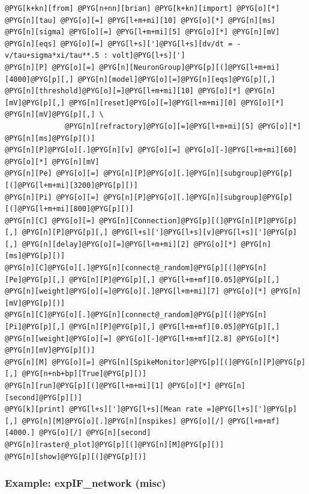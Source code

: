 \documentclass[letterpaper,10pt,english]{manual}
\begin{document}
\begin{Verbatim}[commandchars=@\[\]]
@PYG[k+kn][from] @PYG[n+nn][brian] @PYG[k+kn][import] @PYG[o][*]
@PYG[n][tau] @PYG[o][=] @PYG[l+m+mi][10] @PYG[o][*] @PYG[n][ms]
@PYG[n][sigma] @PYG[o][=] @PYG[l+m+mi][5] @PYG[o][*] @PYG[n][mV]
@PYG[n][eqs] @PYG[o][=] @PYG[l+s][']@PYG[l+s][dv/dt = -v/tau+sigma*xi/tau**.5 : volt]@PYG[l+s][']
@PYG[n][P] @PYG[o][=] @PYG[n][NeuronGroup]@PYG[p][(]@PYG[l+m+mi][4000]@PYG[p][,] @PYG[n][model]@PYG[o][=]@PYG[n][eqs]@PYG[p][,] @PYG[n][threshold]@PYG[o][=]@PYG[l+m+mi][10] @PYG[o][*] @PYG[n][mV]@PYG[p][,] @PYG[n][reset]@PYG[o][=]@PYG[l+m+mi][0] @PYG[o][*] @PYG[n][mV]@PYG[p][,] \
              @PYG[n][refractory]@PYG[o][=]@PYG[l+m+mi][5] @PYG[o][*] @PYG[n][ms]@PYG[p][)]
@PYG[n][P]@PYG[o][.]@PYG[n][v] @PYG[o][=] @PYG[o][-]@PYG[l+m+mi][60] @PYG[o][*] @PYG[n][mV]
@PYG[n][Pe] @PYG[o][=] @PYG[n][P]@PYG[o][.]@PYG[n][subgroup]@PYG[p][(]@PYG[l+m+mi][3200]@PYG[p][)]
@PYG[n][Pi] @PYG[o][=] @PYG[n][P]@PYG[o][.]@PYG[n][subgroup]@PYG[p][(]@PYG[l+m+mi][800]@PYG[p][)]
@PYG[n][C] @PYG[o][=] @PYG[n][Connection]@PYG[p][(]@PYG[n][P]@PYG[p][,] @PYG[n][P]@PYG[p][,] @PYG[l+s][']@PYG[l+s][v]@PYG[l+s][']@PYG[p][,] @PYG[n][delay]@PYG[o][=]@PYG[l+m+mi][2] @PYG[o][*] @PYG[n][ms]@PYG[p][)]
@PYG[n][C]@PYG[o][.]@PYG[n][connect@_random]@PYG[p][(]@PYG[n][Pe]@PYG[p][,] @PYG[n][P]@PYG[p][,] @PYG[l+m+mf][0.05]@PYG[p][,] @PYG[n][weight]@PYG[o][=]@PYG[o][.]@PYG[l+m+mi][7] @PYG[o][*] @PYG[n][mV]@PYG[p][)]
@PYG[n][C]@PYG[o][.]@PYG[n][connect@_random]@PYG[p][(]@PYG[n][Pi]@PYG[p][,] @PYG[n][P]@PYG[p][,] @PYG[l+m+mf][0.05]@PYG[p][,] @PYG[n][weight]@PYG[o][=] @PYG[o][-]@PYG[l+m+mf][2.8] @PYG[o][*] @PYG[n][mV]@PYG[p][)]
@PYG[n][M] @PYG[o][=] @PYG[n][SpikeMonitor]@PYG[p][(]@PYG[n][P]@PYG[p][,] @PYG[n+nb+bp][True]@PYG[p][)]
@PYG[n][run]@PYG[p][(]@PYG[l+m+mi][1] @PYG[o][*] @PYG[n][second]@PYG[p][)]
@PYG[k][print] @PYG[l+s][']@PYG[l+s][Mean rate =]@PYG[l+s][']@PYG[p][,] @PYG[n][M]@PYG[o][.]@PYG[n][nspikes] @PYG[o][/] @PYG[l+m+mf][4000.] @PYG[o][/] @PYG[n][second]
@PYG[n][raster@_plot]@PYG[p][(]@PYG[n][M]@PYG[p][)]
@PYG[n][show]@PYG[p][(]@PYG[p][)]
\end{Verbatim}

\resetcurrentobjects
\hypertarget{--doc-examples-misc_expIF_network}{}

\hypertarget{index-47}{}\subsubsection{Example: expIF\_network (misc)}
\end{document}
